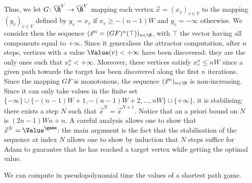 Thus, we let $G\colon\overline\R^V\to\overline\R^V$ mapping each
vertex $\vec x = (x_v)_{v\in V}$ to the mapping $(y_v)_{v\in V}$
defined by $y_v = x_v$ if $x_v\geq -(n-1)W$ and $y_v=-\infty$
otherwise. We consider then the sequence
$(\vec x^n = (GF)^n(\top))_{n\in \N}$, with $\top$ the vector having
all components equal to $+\infty$. Since it generalises the attractor
computation, after $n$ steps, vertices with a value
$\Value(v)<+\infty$ have been discovered: they are the only ones such
that $x^{n}_v < +\infty$. Moreover, these vertices satisfy
$x^{n}_v\leq n W$ since a given path towards the target has been
discovered along the first $n$ iterations. Since the mapping $GF$ is
monotonous, the sequence $(\vec x^n)_{n\in \N}$ is
non-increasing. Since it can only take values in the finite set
$\{-\infty\}\cup \{-(n-1) W+1, -(n-1) W+2,\ldots,nW\}
\cup\{+\infty\}$, it is stabilising: there exists a step $N$ such that
$\vec x^N=\vec x^{N+1}$. Notice that an a priori bound on $N$ is
$(2n-1)W n + n$. A careful analysis allows one to show that
$\vec x^N=\Value^\game$: the main argument is the fact that the
stabilisation of the sequence at index $N$ allows one to show by
induction that $N$ steps suffice for Adam to guarantee that he has
reached a target vertex while getting the optimal value.

\cite{Brihaye&Geeraerts&HaddadA&Monmege:2017}
\begin{theorem}\label{4-thm:SP-pseudopoly-algo}
  We can compute in pseudopolynomial time the values of a
  shortest path game. 
\end{theorem}


